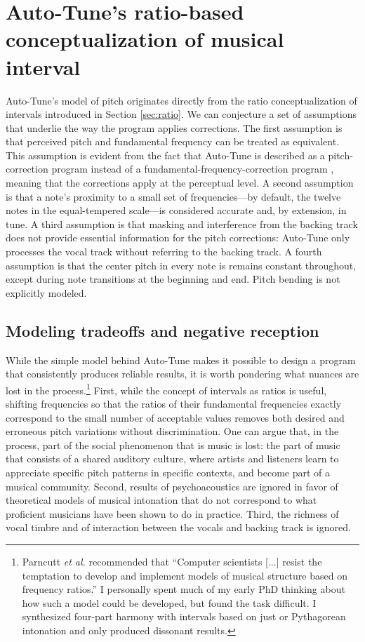 \section{Auto-Tune's ratio-based conceptualization of musical interval}
\label{sec:interval-conceptualization-design}
Auto-Tune's model of pitch originates directly from the ratio conceptualization of intervals introduced in Section \ref{sec:ratio}. We can conjecture a set of assumptions that underlie the way the program applies corrections. The first assumption is that perceived pitch and fundamental frequency can be treated as equivalent. This assumption is evident from the fact that Auto-Tune is described as a pitch-correction program instead of a fundamental-frequency-correction program \cite{antares:2018}, meaning that the corrections apply at the perceptual level. A second assumption is that a note's proximity to a small set of frequencies---by default, the twelve notes in the equal-tempered scale---is considered accurate and, by extension, in tune. A third assumption is that masking and interference from the backing track does not provide essential information for the pitch corrections: Auto-Tune only processes the vocal track without referring to the backing track. A fourth assumption is that the center pitch in every note is remains constant throughout, except during note transitions at the beginning and end. Pitch bending is not explicitly modeled. 

\subsection{Modeling tradeoffs and negative reception}
While the simple model behind Auto-Tune makes it possible to design a program that consistently produces reliable results, it is worth pondering what nuances are lost in the process.\footnote{Parncutt \textit{et al.} recommended that ``Computer scientists [...] resist the temptation to develop and implement models of musical structure based on frequency ratios.'' I personally spent much of my early PhD thinking about how such a model could be developed, but found the task difficult. I synthesized four-part harmony with intervals based on just or Pythagorean intonation and only produced dissonant results.} First, while the concept of intervals as ratios is useful, shifting frequencies so that the ratios of their fundamental frequencies exactly correspond to the small number of acceptable values removes both desired and erroneous pitch variations without discrimination. One can argue that, in the process, part of the social phenomenon that is music is lost: the part of music that consists of a shared auditory culture, where artists and listeners learn to appreciate specific pitch patterns in specific contexts, and become part of a musical community. Second, results of psychoacoustics are ignored in favor of theoretical models of musical intonation that do not correspond to what proficient musicians have been shown to do in practice. Third, the richness of vocal timbre and of interaction between the vocals and backing track is ignored. 

